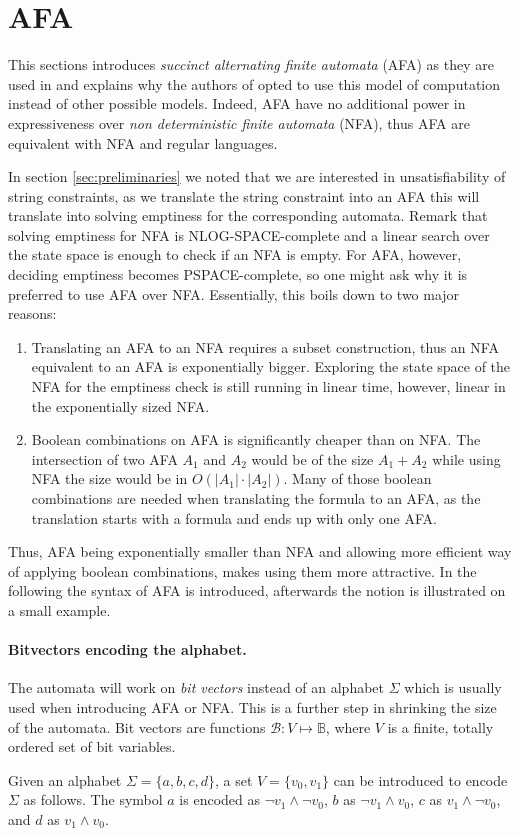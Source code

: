 
\section{AFA}

This sections introduces \emph{succinct alternating finite automata} (AFA) as they are used in \sloth and explains why the authors of \sloth opted to use this model of computation instead of other possible models.
Indeed, AFA have no additional power in expressiveness over \emph{non deterministic finite automata} (NFA), thus AFA are equivalent with NFA and regular languages.

In section \ref{sec:preliminaries} we noted that we are interested in unsatisfiability of string constraints, as we translate the string constraint into an AFA this will translate into solving emptiness for the corresponding automata.
Remark that solving emptiness for NFA is NLOG-SPACE-complete and a linear search over the state space is enough to check if an NFA is empty.
For AFA, however, deciding emptiness becomes PSPACE-complete, so one might ask why it is preferred to use AFA over NFA.
Essentially, this boils down to two major reasons:
\begin{enumerate}
\item Translating an AFA to an NFA requires a subset construction, thus an NFA equivalent to an AFA is exponentially bigger. Exploring the state space of the NFA for the emptiness check is still running in linear time, however, linear in the exponentially sized NFA.

\item Boolean combinations on AFA is significantly cheaper than on NFA. The intersection of two AFA $A_1$ and $A_2$ would be of the size $A_1 + A_2$ while using NFA the size would be in $O(|A_1| \cdot |A_2|)$. Many of those boolean combinations are needed when translating the formula to an AFA, as the translation starts with a formula and ends up with only one AFA.
\end{enumerate}

Thus, AFA being exponentially smaller than NFA and allowing more efficient way of applying boolean combinations, makes using them more attractive.
In the following the syntax of AFA is introduced, afterwards the notion is illustrated on a small example.

\paragraph*{Bitvectors encoding the alphabet.} The automata will work on \emph{bit vectors} instead of an alphabet $\Sigma$ which is usually used when introducing AFA or NFA.
This is a further step in shrinking the size of the automata. Bit vectors are functions $\mathcal{B}: V \mapsto \mathbb{B}$, where $V$ is a finite, totally ordered set of bit variables.
\begin{example}
Given an alphabet $\Sigma = \{a,b,c,d\}$, a set $V = \{v_0,v_1\}$ can be introduced to encode $\Sigma$ as follows. The symbol $a$ is encoded as $\lnot v_1 \wedge \lnot v_0$, $b$ as $\lnot v_1 \wedge v_0$, $c$ as $ v_1 \wedge \lnot v_0$, and $d$ as $v_1 \wedge v_0$.
\end{example}
